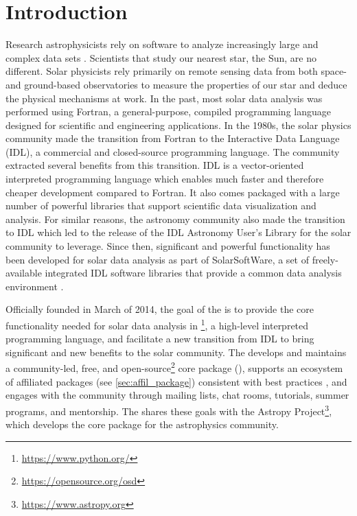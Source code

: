 \section{Introduction}
\label{sec:intro}

Research astrophysicists rely on software to analyze increasingly large and complex data sets .
Scientists that study our nearest star, the Sun, are no different.
Solar physicists rely primarily on remote sensing data from both space- and ground-based observatories to measure the properties of our star and deduce the physical mechanisms at work.
In the past, most solar data analysis was performed using Fortran, a general-purpose, compiled programming language designed for scientific and engineering applications.
In the 1980s, the solar physics community made the transition from Fortran to the Interactive Data Language (IDL), a commercial and closed-source programming language.
The community extracted several benefits from this transition.
IDL is a vector-oriented interpreted programming language which enables much faster and therefore cheaper development compared to Fortran.
It also comes packaged with a large number of powerful libraries that support scientific data visualization and analysis.
For similar reasons, the astronomy community also made the transition to IDL which led to the release of the IDL Astronomy User's Library for the solar community to leverage.
Since then, significant and powerful functionality has been developed for solar data analysis as part of SolarSoftWare, a set of freely-available integrated IDL software libraries that provide a common data analysis environment \citep{Freeland:1998we}.

Officially founded in March of 2014, the goal of the \sunpyproj is to provide the core functionality needed for solar data analysis in \python\footnote{\url{https://www.python.org/}}, a high-level interpreted  programming language, and facilitate a new transition from IDL to bring significant and new benefits to the solar community.
The \sunpyproj develops and maintains a community-led, free, and open-source\footnote{\url{https://opensource.org/osd}} core \python package (\sunpypkg), supports an ecosystem of affiliated packages (see \autoref{sec:affil_package}) consistent with best practices \citep{Wilson:2014cka}, and engages with the community through mailing lists, chat rooms, tutorials, summer programs, and mentorship.
The \sunpyproj shares these goals with the Astropy Project\footnote{\url{https://www.astropy.org}}, which develops the \astropypkg core package \citep{astropy2018} for the astrophysics community.

